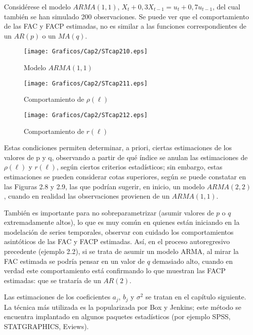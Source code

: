 \begin{ejemplo}
Consid\'{e}rese el modelo $ARMA(1,1)$, $X_{t}+0,3X_{t-1}=u_{t}+0,7u_{t-1}$, del cual tambi\'{e}n se han simulado 200 observaciones. Se puede ver que el comportamiento de las FAC y FACP estimadas, no es similar a las funciones correspondientes de un $AR(p)$ o un $MA(q)$. 

\begin{figure}[H]
\centering
\texttt{[image: Graficos/Cap2/STcap210.eps]}
\caption{Modelo $ARMA(1,1)$}
\end{figure}

\begin{figure}[H]
\centering
\texttt{[image: Graficos/Cap2/STcap211.eps]}
\caption{Comportamiento de $\rho (\ell)$}
\end{figure}

\begin{figure}[H]
\centering
\texttt{[image: Graficos/Cap2/STcap212.eps]}
\caption{Comportamiento de $r(\ell)$}
\end{figure}

\end{ejemplo}


Estas condiciones permiten determinar, a priori, ciertas estimaciones de los valores de p y q, observando a partir de qu\'{e} \'{i}ndice se anulan las estimaciones de $\rho (\ell)$ y $r(\ell)$, seg\'{u}n ciertos criterios 
estad\'{i}sticos; sin embargo, estas estimaciones se pueden considerar cotas superiores, seg\'{u}n se puede constatar en las Figuras 2.8 y 2.9, las que podr\'{i}an sugerir, en inicio, un modelo $ARMA(2,2)$, cuando en realidad las observaciones provienen de un $ARMA(1,1)$.\newline

Tambi\'{e}n es importante para no sobreparametrizar (asumir valores de $p$ o $q$ extremadamente altos), lo que es muy com\'{u}n en quienes est\'{a}n iniciando en la modelaci\'{o}n de series temporales, observar con cuidado los comportamientos asint\'{o}ticos de las FAC y FACP estimadas. As\'{i}, en el proceso autoregresivo precedente (ejemplo 2.2), si se trata de asumir un modelo ARMA, al mirar la FAC estimada se podr\'{i}a pensar en un valor de $q$ demasiado alto, cuando en verdad este comportamiento est\'{a} confirmando lo que muestran las FACP estimadas: que se tratar\'{i}a de un $AR(2)$.\newline

Las estimaciones de los coeficientes $a_{j}$, $b_{j}$ y $\sigma^{2}$ se tratan en el cap\'{i}tulo siguiente. La t\'{e}cnica m\'{a}s utilizada es la popularizada por Box y Jenkins; este m\'{e}todo se encuentra implantado en algunos paquetes estad\'{i}sticos (por ejemplo SPSS, STATGRAPHICS, Eviews).

